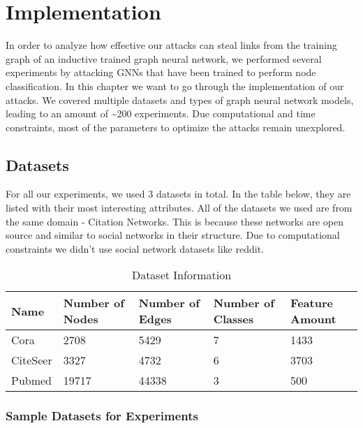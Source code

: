 \chapter{Implementation}

  In order to analyze how effective our attacks can steal links from the training graph of an inductive trained graph neural network, we performed several experiments by attacking GNNs that have been trained to perform node classification.
  In this chapter we want to go through the implementation of our attacks.
  We covered multiple datasets and types of graph neural network models, leading to an amount of \textasciitilde200 experiments.
  Due computational and time constraints, most of the parameters to optimize the attacks remain unexplored.

  \section{Datasets}
  \label{section:datasets}

    For all our experiments, we used 3 datasets in total.
    In the table below, they are listed with their most interesting attributes.
    All of the datasets we used are from the same domain - Citation Networks.
    This is because these networks are open source and similar to social networks in their structure.
    Due to computational constraints we didn't use social network datasets like reddit.

    \vspace{0.48cm}
    \begin{table}[!h]
      \centering
      \footnotesize
      \begin{tabular}{l|l|l|l|l}
        \toprule
        Name & Number of Nodes & Number of Edges & Number of Classes & Feature Amount \\
        \midrule
        Cora & 2708            & 5429            & 7                 & 1433 \\
        CiteSeer & 3327        & 4732            & 6                 & 3703 \\
        Pubmed & 19717         & 44338           & 3                 & 500 \\
        \bottomrule
      \end{tabular}
      \caption{Dataset Information}
      \label{table:datasets}
    \end{table}

    \subsection*{Sample Datasets for Experiments}
    \label{subsection:dataset-samples}

